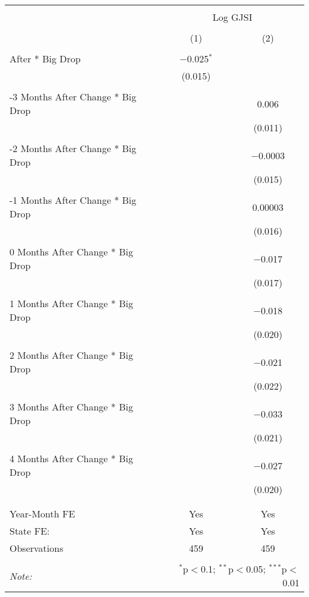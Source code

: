 
\begin{tabular}{@{\extracolsep{5pt}}lcc} 
\\[-1.8ex]\hline 
\hline \\[-1.8ex] 
 & \multicolumn{2}{c}{Log GJSI} \\ 
\cline{2-3} 
\\[-1.8ex] & (1) & (2)\\ 
\hline \\[-1.8ex] 
 After * Big Drop & $-$0.025$^{*}$ &  \\ 
  & (0.015) &  \\ 
  & & \\ 
 -3 Months After Change * Big Drop &  & 0.006 \\ 
  &  & (0.011) \\ 
  & & \\ 
 -2 Months After Change * Big Drop &  & $-$0.0003 \\ 
  &  & (0.015) \\ 
  & & \\ 
 -1 Months After Change * Big Drop &  & 0.00003 \\ 
  &  & (0.016) \\ 
  & & \\ 
 0 Months After Change * Big Drop &  & $-$0.017 \\ 
  &  & (0.017) \\ 
  & & \\ 
 1 Months After Change * Big Drop &  & $-$0.018 \\ 
  &  & (0.020) \\ 
  & & \\ 
 2 Months After Change * Big Drop &  & $-$0.021 \\ 
  &  & (0.022) \\ 
  & & \\ 
 3 Months After Change * Big Drop &  & $-$0.033 \\ 
  &  & (0.021) \\ 
  & & \\ 
 4 Months After Change * Big Drop &  & $-$0.027 \\ 
  &  & (0.020) \\ 
  & & \\ 
\hline \\[-1.8ex] 
Year-Month FE & Yes & Yes \\ 
State FE: & Yes & Yes \\ 
Observations & 459 & 459 \\ 
\hline 
\hline \\[-1.8ex] 
\textit{Note:}  & \multicolumn{2}{r}{$^{*}$p$<$0.1; $^{**}$p$<$0.05; $^{***}$p$<$0.01} \\ 
\end{tabular} 
